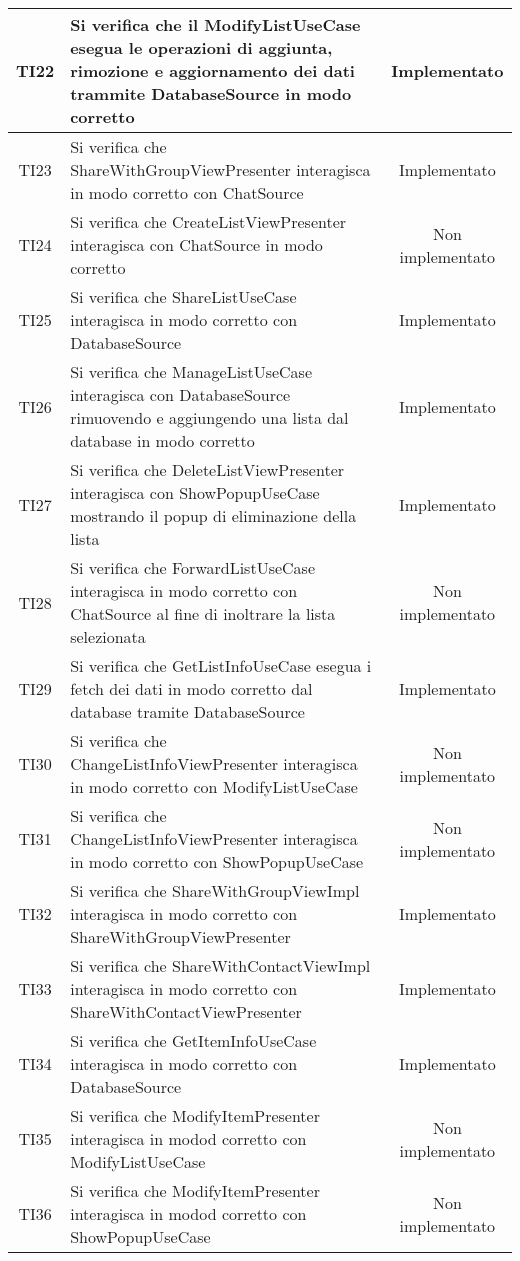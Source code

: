 \begin{center}
\begin{longtable}{|c|>{\centering}m{10cm}|c|}
		TI22 & Si verifica che il ModifyListUseCase esegua le operazioni di aggiunta, rimozione e aggiornamento dei dati trammite DatabaseSource in modo corretto & Implementato \\ \hline
		TI23 & Si verifica che ShareWithGroupViewPresenter interagisca in modo corretto con ChatSource & Implementato \\ \hline
		TI24 & Si verifica che CreateListViewPresenter interagisca con ChatSource in modo corretto & Non implementato \\ \hline
		TI25 & Si verifica che ShareListUseCase interagisca in modo corretto con DatabaseSource & Implementato \\ \hline
		TI26 & Si verifica che ManageListUseCase interagisca con DatabaseSource rimuovendo e aggiungendo una lista dal database in modo corretto & Implementato \\ \hline
		TI27 & Si verifica che DeleteListViewPresenter interagisca con ShowPopupUseCase mostrando il popup di eliminazione della lista & Implementato \\ \hline
		TI28 & Si verifica che ForwardListUseCase interagisca in modo corretto con ChatSource al fine di inoltrare la lista selezionata & Non implementato \\ \hline
		TI29 & Si verifica che GetListInfoUseCase esegua i fetch dei dati in modo corretto dal database tramite DatabaseSource & Implementato \\ \hline
		TI30 & Si verifica che ChangeListInfoViewPresenter interagisca in modo corretto con ModifyListUseCase & Non implementato \\ \hline
		TI31 & Si verifica che ChangeListInfoViewPresenter interagisca in modo corretto con ShowPopupUseCase & Non implementato \\ \hline
		TI32 & Si verifica che ShareWithGroupViewImpl interagisca in modo corretto con ShareWithGroupViewPresenter & Implementato \\ \hline
		TI33 & Si verifica che ShareWithContactViewImpl interagisca in modo corretto con ShareWithContactViewPresenter & Implementato \\ \hline
		TI34 & Si verifica che GetItemInfoUseCase interagisca in modo corretto con DatabaseSource & Implementato \\ \hline
		TI35 & Si verifica che ModifyItemPresenter interagisca in modod corretto con ModifyListUseCase & Non implementato \\ \hline
		TI36 & Si verifica che ModifyItemPresenter interagisca in modod corretto con ShowPopupUseCase & Non implementato \\ \hline

\end{longtable}
\end{center}
